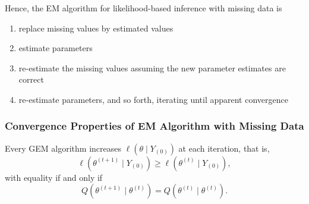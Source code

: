 Hence, the EM algorithm for likelihood-based inference with missing data is
\begin{enumerate}
	\item replace missing values by estimated
	      values
	\item estimate parameters
	\item re-estimate the missing values assuming the new parameter estimates are correct
	\item re-estimate parameters, and so forth, iterating until apparent convergence
\end{enumerate}

\subsubsection{Convergence Properties of EM Algorithm with Missing Data}

\begin{theorem}
	Every GEM algorithm increases \(\ell\left(\theta \mid Y_{(0)}\right)\) at each iteration, that is,
	\begin{equation}
		\ell\left(\theta^{(t+1)} \mid Y_{(0)}\right) \geq \ell\left(\theta^{(t)} \mid Y_{(0)}\right),
	\end{equation}
	with equality if and only if
	\begin{equation}
		Q\left(\theta^{(t+1)} \mid \theta^{(t)}\right)=Q\left(\theta^{(t)} \mid \theta^{(t)}\right).
	\end{equation}
\end{theorem}

